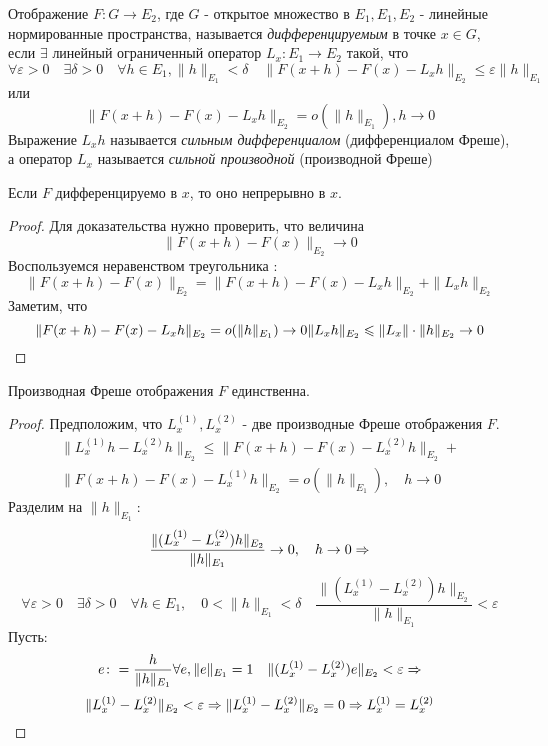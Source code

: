 \begin{definition} 
    Отображение $F \colon G \to E_2$, где $G$ - открытое множество в $E_1, E_1, E_2$ - линейные нормированные пространства, называется \textit{дифференцируемым} в точке $x \in G$, если $\exists$ линейный ограниченный оператор $L_x \colon E_1 \to E_2$ такой, что 
    \[
        \forall \varepsilon > 0 \quad \exists \delta > 0 \quad \forall h\in E_1, \| h \|_{E_1} < \delta \quad \| F(x+h) - F(x) - L_x h \|_{E_2} \leq \varepsilon \|h\|_{E_1}
    \]
    или
    \[
        \|F(x+h)-F(x)-L_x h\|_{E_2}=o(\|h\|_{E_1}), h \to 0
    \]
    Выражение $L_x h$ называется \textit{сильным дифференциалом} (дифференциалом Фреше), а оператор $L_x$ называется \textit{сильной производной} (производной Фреше)
\end{definition} 

\begin{proposition}
    Если $F$ дифференцируемо в $x$, то оно непрерывно в $x$.
\end{proposition}
\begin{proof}
    Для доказательства нужно проверить, что величина 
    \[
        \|F(x+h)-F(x)\|_{E_2} \to 0
    \]
    Воспользуемся неравенством треугольника $\colon$ 
    \[  
        \|F(x+h)-F(x)\|_{E_2} = \|F(x+h)-F(x)-L_x h\|_{E_2} + \|L_x h\|_{E_2}
    \]
    Заметим, что 
    \[
        \|F(x+h)-F(x)-L_x h\|_{E_2} = o(\|h\|_{E_1}) \to 0 \\
        \|L_x h\|_{E_2}\leq\|L_x\| \cdot \|h\|_{E_2} \to 0
    \]
\end{proof}

\begin{proposition}
    Производная Фреше отображения $F$ единственна.
\end{proposition}
\begin{proof}
    Предположим, что $L^{(1)}_x, L^{(2)}_x$ - две производные Фреше отображения $F$. 
    \begin{multline*}
        \|L^{(1)}_x h - L^{(2)}_x h\|_{E_2} \leq \|F(x+h)-F(x)-L^{(2)}_x h\|_{E_2} +\\
        \|F(x+h)-F(x)-L^{(1)}_x h\|_{E_2} = o(\|h\|_{E_1}),\quad h \to 0
    \end{multline*}
    Разделим на $\|h\|_{E_1} \colon$
    \[
        \frac{\|(L^{(1)}_x- L^{(2)}_x)h\|_{E_2}}{\|h\|_{E_1}} \to 0, \quad h \to 0 \Ra
    \]
    \[
        \forall \varepsilon>0 \quad \exists \delta>0 \quad \forall h \in E_1, \quad 0<\|h\|_{E_1}<\delta \quad \frac{\|(L^{(1)}_x- L^{(2)}_x)h\|_{E_2}}{\|h\|_{E_1}} < \varepsilon
    \]
    Пусть$\colon$
    \[  
        e\colon = \frac{h}{\|h\|_{E_1}}\\
        \forall e, \|e\|_{E_1}=1 \quad \|(L^{(1)}_x- L^{(2)}_x)e\|_{E_2} < \varepsilon \Ra 
    \]
    \[ 
        \|L^{(1)}_x- L^{(2)}_x\|_{E_2} < \varepsilon \Ra \|L^{(1)}_x- L^{(2)}_x\|_{E_2} = 0 \Ra L^{(1)}_x= L^{(2)}_x
    \]
\end{proof}

